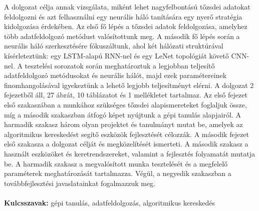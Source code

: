 \documentclass[a4paper,oneside,onecolumn,12pt]{book}
\begin{document}
\label{sec:absztrakt}
\thispagestyle{empty}
A dolgozat célja annak vizsgálata, miként lehet nagyfelbontású tőzsdei adatokat feldolgozni és azt felhasználni egy neurális háló tanítására egy nyerő stratégia kidolgozása érdekében. Az első fő lépés a tőzsdei adatok feldolgozása, amelyhez több adatfeldolgozó metódust valósítottunk meg. A második fő lépés során a neurális háló szerkesztésére fókuszáltunk, ahol két hálózati struktúrával kísérleteztünk: egy LSTM-alapú RNN-nel és egy LeNet topológiát követő CNN-nel. A tesztelési sorozatok során meghatároztuk a legjobban teljesítő adatfeldolgozó metódusokat és neurális hálót, majd ezek paramétereinek finomhangolásával igyekeztünk a lehető legjobb teljesítményt elérni. A dolgozat 2 fejezetből áll, 27 ábrát, 10 táblázatot és 1 mellékletet tartalmaz. Az első fejezet első szakaszában a munkához szükséges tőzsdei alapismereteket foglaljuk össze, míg a második szakaszban átfogó képet nyújtunk a gépi tanulás alapjairól. A harmadik szakasz három olyan projektet és tanulmányt mutat be, amelyek az algoritmikus kereskedést segítő eszközök fejlesztését célozzák. A második fejezet első szakasza a dolgozat célját és megközelítését ismerteti. A második szakasz a használt eszközöket és keretrendszereket, valamint a fejlesztés folyamatát mutatja be. A harmadik szakasz a megvalósított munka tesztelését és a megfelelő paraméterek meghatározását tartalmazza. Végül, a negyedik szakaszban a továbbfejlesztési javaslatainkat fogalmazzuk meg.
\\\\
\textbf{Kulcsszavak:} gépi tanulás, adatfeldolgozás, algoritmikus kereskedés

\pagebreak
\end{document}
